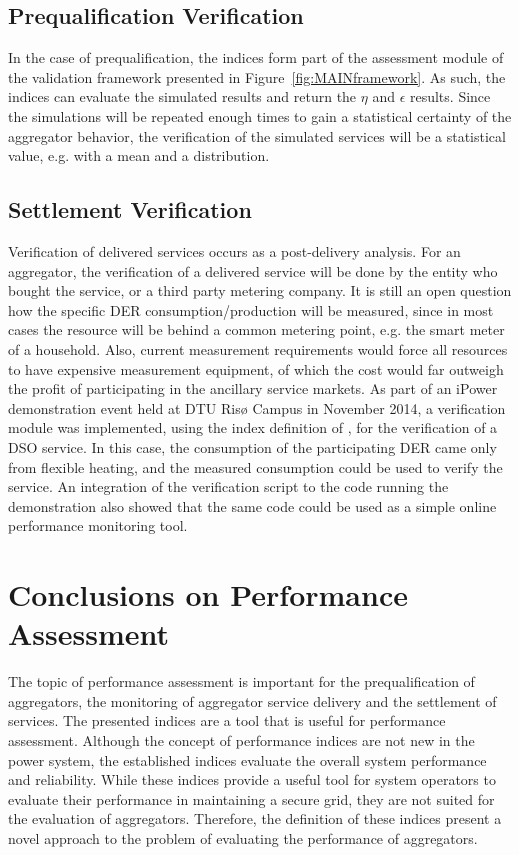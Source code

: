 \subsection{Prequalification Verification}
In the case of prequalification, the indices form part of the assessment module of the validation framework presented in Figure~\ref{fig:MAINframework}. As such, the indices can evaluate the simulated results and return the $\eta$ and $\epsilon$ results. Since the simulations will be repeated enough times to gain a statistical certainty of the aggregator behavior, the verification of the simulated services will be a statistical value, e.g. with a mean and a distribution.

\subsection{Settlement Verification}
Verification of delivered services occurs as a post-delivery analysis. For an aggregator, the verification of a delivered service will be done by the entity who bought the service, or a third party metering company. It is still an open question how the specific DER consumption/production will be measured, since in most cases the resource will be behind a common metering point, e.g. the smart meter of a household. Also, current measurement requirements would force all resources to have expensive measurement equipment, of which the cost would far outweigh the profit of participating in the ancillary service markets. As part of an iPower demonstration event held at DTU Risø Campus in November 2014, a verification module was implemented, using the index definition of \cite{bondy2014performance}, for the verification of a DSO service. In this case, the consumption of the participating DER came only from flexible heating, and the measured consumption could be used to verify the service. An integration of the verification script to the code running the demonstration also showed that the same code could be used as a simple online performance monitoring tool.

\section{Conclusions on Performance Assessment}
The topic of performance assessment is important for the prequalification of aggregators, the monitoring of aggregator service delivery and the settlement of services. The presented indices are a tool that is useful for performance assessment. Although the concept of performance indices are not new in the power system, the established indices evaluate the overall system performance and reliability. While these indices provide a useful tool for system operators to evaluate their performance in maintaining a secure grid, they are not suited for the evaluation of aggregators. Therefore, the definition of these indices present a novel approach to the problem of evaluating the performance of aggregators.

